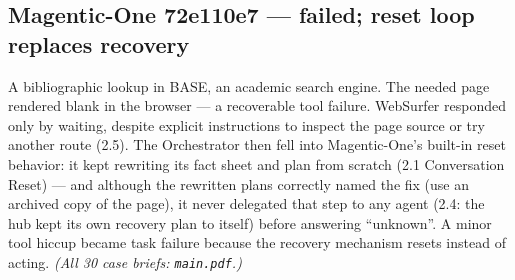\documentclass[10pt]{article}
\begin{document}
\subsection*{Magentic-One 72e110e7 --- failed; reset loop replaces recovery}
A bibliographic lookup in BASE, an academic search engine. The needed page
rendered blank in the browser --- a recoverable tool failure. WebSurfer
responded only by waiting, despite explicit instructions to inspect the page
source or try another route (2.5). The Orchestrator then fell into
Magentic-One's built-in reset behavior: it kept rewriting its fact sheet and
plan from scratch (2.1 Conversation Reset) --- and although the rewritten
plans correctly named the fix (use an archived copy of the page), it never
delegated that step to any agent (2.4: the hub kept its own recovery plan to
itself) before answering ``unknown''. A minor tool hiccup became task
failure because the recovery mechanism resets instead of acting. \emph{(All
30 case briefs: \texttt{main.pdf}.)}
\end{document}
